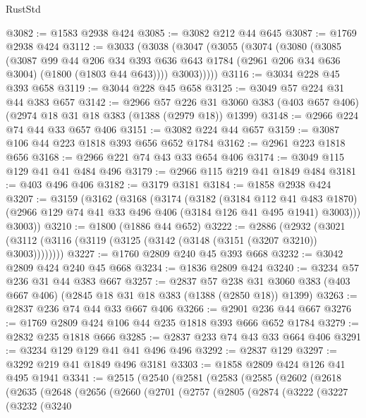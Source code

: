 \begin{lexlean}{RustStd}
\begin{coremodule}
@3082 := @1583 @2938 @424
@3085 := @3082 @212 @44 @645
@3087 := @1769 @2938 @424
@3112 := @3033
    (@3038
      (@3047
        (@3055
          (@3074
            (@3080
              (@3085
                (@3087
                  @99
                  @44
                  @206
                  @34
                  @393
                  @636
                  @643
                  @1784
                  (@2961 @206 @34 @636 @3004)
                  (@1800 (@1803 @44 @643))))
              @3003)))))
@3116 := @3034 @228 @45 @393 @658
@3119 := @3044 @228 @45 @658
@3125 := @3049 @57 @224 @31 @44 @383 @657
@3142 := @2966
    @57
    @226
    @31
    @3060
    @383
    (@403 @657 @406)
    (@2974 @18 @31 @18 @383 (@1388 (@2979 @18)) @1399)
@3148 := @2966 @224 @74 @44 @33 @657 @406
@3151 := @3082 @224 @44 @657
@3159 := @3087 @106 @44 @223 @1818 @393 @656 @652 @1784
@3162 := @2961 @223 @1818 @656
@3168 := @2966 @221 @74 @43 @33 @654 @406
@3174 := @3049 @115 @129 @41 @41 @484 @496
@3179 := @2966 @115 @219 @41 @1849 @484
@3181 := @403 @496 @406
@3182 := @3179 @3181
@3184 := @1858 @2938 @424
@3207 := @3159
    (@3162
      (@3168
        (@3174
          (@3182
            (@3184 @112 @41 @483 @1870)
            (@2966 @129 @74 @41 @33 @496 @406 (@3184 @126 @41 @495 @1941) @3003)))
        @3003))
@3210 := @1800 (@1886 @44 @652)
@3222 := @2886
    (@2932 (@3021 (@3112 (@3116 (@3119 (@3125 (@3142 (@3148 (@3151 (@3207 @3210)) @3003))))))))
@3227 := @1760 @2809 @240 @45 @393 @668
@3232 := @3042 @2809 @424 @240 @45 @668
@3234 := @1836 @2809 @424
@3240 := @3234 @57 @236 @31 @44 @383 @667
@3257 := @2837
    @57
    @238
    @31
    @3060
    @383
    (@403 @667 @406)
    (@2845 @18 @31 @18 @383 (@1388 (@2850 @18)) @1399)
@3263 := @2837 @236 @74 @44 @33 @667 @406
@3266 := @2901 @236 @44 @667
@3276 := @1769 @2809 @424 @106 @44 @235 @1818 @393 @666 @652 @1784
@3279 := @2832 @235 @1818 @666
@3285 := @2837 @233 @74 @43 @33 @664 @406
@3291 := @3234 @129 @129 @41 @41 @496 @496
@3292 := @2837 @129
@3297 := @3292 @219 @41 @1849 @496 @3181
@3303 := @1858 @2809 @424 @126 @41 @495 @1941
@3341 := @2515
    (@2540
      (@2581
        (@2583
          (@2585
            (@2602
              (@2618
                (@2635
                  (@2648
                    (@2656
                      (@2660
                        (@2701
                          (@2757
                            (@2805
                              (@2874
                                (@3222
                                  (@3227
                                    (@3232
                                      (@3240

\end{coremodule}
\end{lexlean}
